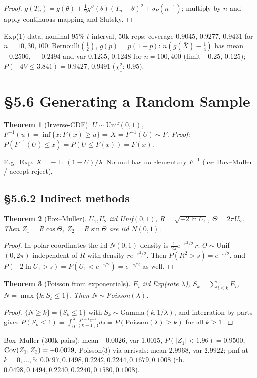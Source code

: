 \documentclass[11pt]{article}
\newtheorem{theorem}{Theorem}[section]
\begin{document}
\begin{proof}
$g(T_n)=g(\theta)+\frac12g''(\theta)(T_n-\theta)^2+o_P(n^{-1})$; multiply by $n$ and apply continuous mapping and Slutsky.
\end{proof}
\begin{simbox}
Exp(1) data, nominal 95\% $t$ interval, 50k reps: coverage $0.9045,\,0.9277,\,0.9431$ for $n=10,30,100$. Bernoulli$(\frac12)$, $g(p)=p(1-p)$: $n(g(\bar X)-\frac14)$ has mean $-0.2506,\,-0.2494$ and var $0.1235,\,0.1248$ for $n=100,400$ (limit $-0.25$, $0.125$); $P(-4V\le3.841)=0.9427,\,0.9491$ ($\chi^2_1$: $0.95$).
\end{simbox}

\section{\S5.6 Generating a Random Sample}
\begin{theorem}[Inverse-CDF]
$U\sim\mathrm{Unif}(0,1)$, $F^{-1}(u)=\inf\{x:F(x)\ge u\}\Rightarrow X=F^{-1}(U)\sim F$. Proof: $P(F^{-1}(U)\le x)=P(U\le F(x))=F(x)$.
\end{theorem}
E.g.\ Exp: $X=-\ln(1-U)/\lambda$. Normal has no elementary $F^{-1}$ (use Box--Muller / accept-reject).
\subsection*{\S5.6.2 Indirect methods}
\begin{theorem}[Box--Muller]
$U_1,U_2$ iid Unif$(0,1)$, $R=\sqrt{-2\ln U_1}$, $\Theta=2\pi U_2$. Then $Z_1=R\cos\Theta$, $Z_2=R\sin\Theta$ are iid $N(0,1)$.
\end{theorem}
\begin{proof}
In polar coordinates the iid $N(0,1)$ density is $\frac1{2\pi}e^{-r^2/2}\,r$: $\Theta\sim$Unif$(0,2\pi)$ independent of $R$ with density $re^{-r^2/2}$. Then $P(R^2>s)=e^{-s/2}$, and $P(-2\ln U_1>s)=P(U_1<e^{-s/2})=e^{-s/2}$ as well.
\end{proof}
\begin{theorem}[Poisson from exponentials]
$E_i$ iid Exp(rate $\lambda$), $S_k=\sum_{i\le k}E_i$, $N=\max\{k:S_k\le1\}$. Then $N\sim$Poisson$(\lambda)$.
\end{theorem}
\begin{proof}
$\{N\ge k\}=\{S_k\le1\}$ with $S_k\sim$Gamma$(k,1/\lambda)$, and integration by parts gives $P(S_k\le1)=\int_0^\lambda\frac{s^{k-1}e^{-s}}{(k-1)!}ds=P(\mathrm{Poisson}(\lambda)\ge k)$ for all $k\ge1$.
\end{proof}
\begin{simbox}
Box--Muller (300k pairs): mean $+0.0026$, var $1.0015$, $P(|Z_1|<1.96)=0.9500$, $\operatorname{Cov}(Z_1,Z_2)=+0.0029$. Poisson(3) via arrivals: mean $2.9968$, var $2.9922$; pmf at $k=0,\dots,5$: $0.0497,0.1498,0.2242,0.2244,0.1679,0.1008$ (th.\ $0.0498,0.1494,0.2240,0.2240,0.1680,0.1008$).
\end{simbox}
\end{document}
